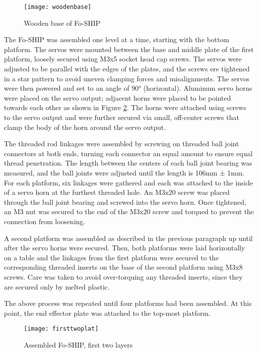 \documentclass[12pt,a4paper]{report}
\begin{document}
\begin{figure}[htbp]
	\centering
	\texttt{[image: woodenbase]}
	\caption{Wooden base of Fo-SHIP}
	\label{fig:woodenbase}
\end{figure}

The Fo-SHIP was assembled one level at a time, starting with the bottom platform. The servos were mounted between the base and middle plate of the first platform, loosely secured using M3x5 socket head cap screws. The servos were adjusted to be parallel with the edges of the plates, and the screws ere tightened in a star pattern to avoid uneven clamping forces and misalignments. The servos were then powered and set to an angle of 90° (horizontal). Aluminum servo horns were placed on the servo output; adjacent horns were placed to be pointed towards each other as shown in Figure \ref{fig:firsttwoplat}. The horns were attached using screws to the servo output and were further secured via small, off-center screws that clamp the body of the horn around the servo output.

The threaded rod linkages were assembled by screwing on threaded ball joint connectors at both ends, turning each connector an equal amount to ensure equal thread penetration. The length between the centers of each ball joint bearing was measured, and the ball joints were adjusted until the length is 106mm ± 1mm. For each platform, six linkages were gathered and each was attached to the inside of a servo horn at the furthest threaded hole. An M3x20 screw was placed through the ball joint bearing and screwed into the servo horn. Once tightened, an M3 nut was secured to the end of the M3x20 screw and torqued to prevent the connection from loosening.

A second platform was assembled as described in the previous paragraph up until after the servo horns were secured. Then, both platforms were laid horizontally on a table and the linkages from the first platform were secured to the corresponding threaded inserts on the base of the second platform using M3x8 screws. Care was taken to avoid over-torquing any threaded inserts, since they are secured only by melted plastic. 

The above process was repeated until four platforms had been assembled. At this point, the end effector plate was attached to the top-most platform.

\begin{figure}[htbp]
	\centering
	\texttt{[image: firsttwoplat]}
	\caption{Assembled Fo-SHIP, first two layers}
	\label{fig:firsttwoplat}
\end{figure}
\end{document}
